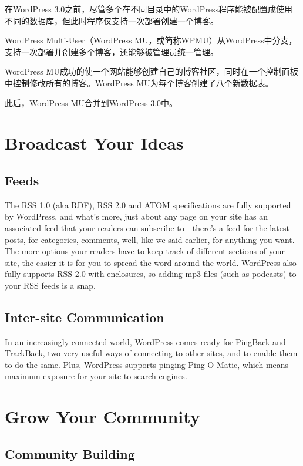 在WordPress 3.0之前，尽管多个在不同目录中的WordPress程序能被配置成使用不同的数据库，但此时程序仅支持一次部署创建一个博客。

WordPress Multi-User（WordPress MU，或简称WPMU）从WordPress中分支，支持一次部署并创建多个博客，还能够被管理员统一管理。

WordPress MU成功的使一个网站能够创建自己的博客社区，同时在一个控制面板中控制修改所有的博客。WordPress MU为每个博客创建了八个新数据表。

此后，WordPress MU合并到WordPress 3.0中。

\section{Broadcast Your Ideas}


\subsection{Feeds}

The RSS 1.0 (aka RDF), RSS 2.0 and ATOM specifications are fully supported by WordPress, and what's more, just about any page on your site has an associated feed that your readers can subscribe to - there's a feed for the latest posts, for categories, comments, well, like we said earlier, for anything you want. The more options your readers have to keep track of different sections of your site, the easier it is for you to spread the word around the world. WordPress also fully supports RSS 2.0 with enclosures, so adding mp3 files (such as podcasts) to your RSS feeds is a snap.

\subsection{Inter-site Communication}

In an increasingly connected world, WordPress comes ready for PingBack and TrackBack, two very useful ways of connecting to other sites, and to enable them to do the same. Plus, WordPress supports pinging Ping-O-Matic, which means maximum exposure for your site to search engines.

\section{Grow Your Community}



\subsection{Community Building}
 
